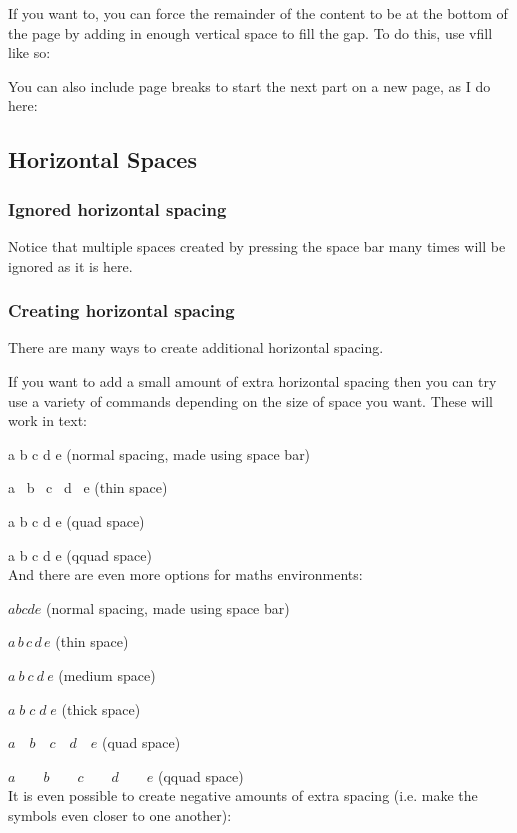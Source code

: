\documentclass[a4paper,11pt]{article}
\begin{document}
If you want to, you can force the remainder of the content to be at the bottom of the page by adding in enough vertical space to fill the gap. To do this, use vfill like so: \vfill

You can also include page breaks to start the next part on a new page, as I do here:
\pagebreak


\subsection{Horizontal Spaces}

\subsubsection{Ignored horizontal spacing}

Notice      that       multiple         spaces          created     by        pressing        the     space     bar        many          times           will            be        ignored    as    it     is    here.


\subsubsection{Creating horizontal spacing}

There are many ways to create additional horizontal spacing.

If you want to add a small amount of extra horizontal spacing then you can try use a variety of commands depending on the size of space you want. These will work in text:

a b c d e (normal spacing, made using space bar)

a \, b \, c \, d \, e (thin space)

a \quad b \quad c \quad d \quad e (quad space)

a \qquad b \qquad c \qquad d \qquad e (qquad space)\\
And there are even more options for maths environments:

$a b c d e$ (normal spacing, made using space bar)

$a \, b \, c \, d \, e$ (thin space)

$a \: b \: c \: d \: e$ (medium space)

$a \; b \; c \; d \; e$ (thick space)

$a \quad b \quad c \quad d \quad e$ (quad space)

$a \qquad b \qquad c \qquad d \qquad e$ (qquad space)\\
It is even possible to create negative amounts of extra spacing (i.e. make the symbols even closer to one another):
\end{document}
